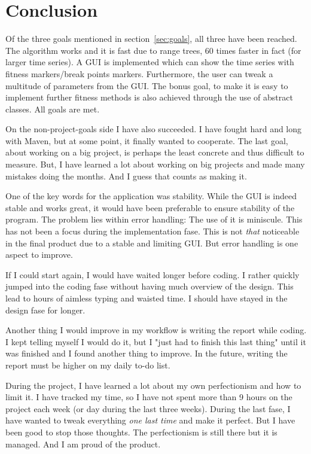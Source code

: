 
\section{Conclusion}

Of the three goals mentioned in section~\ref{sec:goals}, all three have been
reached. The algorithm works and it is fast due to range trees, 60 times faster
in fact (for larger time series). A GUI is
implemented which can show the time series with fitness markers/break points
markers. Furthermore, the user can tweak a multitude of parameters from the GUI.
The bonus goal, to make it is easy to implement further fitness methods is also
achieved through the use of abstract classes. All goals are met. 

On the non-project-goals side I have also succeeded. I have fought hard and long
with Maven, but at some point, it finally wanted to cooperate. The last goal,
about working on a big project, is perhaps the least concrete and thus difficult to
measure. But, I have learned a lot about working on big projects and made many
mistakes doing the months. And I guess that counts as making it. 

One of the key words for the application was stability. While the GUI is indeed
stable and works great, it would have been preferable to ensure stability of the
program. The problem lies within error handling: The use of it is miniscule.
This has not been a focus during the implementation fase. This is not
\textit{that} noticeable in the final product due to a stable and limiting GUI.
But error handling is one aspect to improve. 

If I could start again, I would have waited longer before coding. I rather
quickly jumped into the coding fase without having much overview of the design.
This lead to hours of aimless typing and waisted time. I should have stayed in
the design fase for longer. 

Another thing I would improve in my workflow is writing the report while coding.
I kept telling myself I would do it, but I "just had to finish this last thing"
until it was finished and I found another thing to improve. In the future,
writing the report must be higher on my daily to-do list. 

During the project, I have learned a lot about my own perfectionism and how to
limit it. I have tracked my time, so I have not spent more than 9 hours on the
project each week (or day during the last three weeks). During the last fase, I
have wanted to tweak everything \textit{one last time} and make it perfect. But
I have been good to stop those thoughts. The perfectionism is still there but it
is managed. And I am proud of the product. 